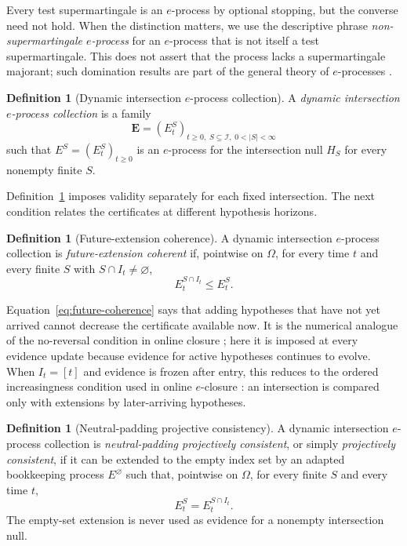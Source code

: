 \documentclass[11pt]{article}
\numberwithin{equation}{section}
\theoremstyle{plain}
\theoremstyle{definition}
\newtheorem{definition}[theorem]{Definition}
\newcommand{\Iuniv}{\mathcal I}
\begin{document}
Every test supermartingale is an $e$-process by optional stopping, but the converse need not hold. When the distinction matters, we use the descriptive phrase \emph{non-supermartingale $e$-process} for an $e$-process that is not itself a test supermartingale. This does not assert that the process lacks a supermartingale majorant; such domination results are part of the general theory of $e$-processes \citep{RamdasRufLarssonKoolen2020}.

\begin{definition}[Dynamic intersection $e$-process collection]\label{def:intersection-system}
A \emph{dynamic intersection $e$-process collection} is a family
\[
  \mathbf E=(E_t^S)_{t\geq0,\;S\subseteq\Iuniv,\;0<|S|<\infty}
\]
such that $E^S=(E_t^S)_{t\geq0}$ is an $e$-process for the intersection null $H_S$ for every nonempty finite $S$.
\end{definition}

Definition~\ref{def:intersection-system} imposes validity separately for each fixed intersection. The next condition relates the certificates at different hypothesis horizons.

\begin{definition}[Future-extension coherence]\label{def:future-coherence}
A dynamic intersection $e$-process collection is \emph{future-extension coherent} if, pointwise on $\Omega$, for every time $t$ and every finite $S$ with $S\cap I_t\neq\varnothing$,
\begin{equation}\label{eq:future-coherence}
  E_t^{S\cap I_t}\leq E_t^S.
\end{equation}
\end{definition}

Equation~\eqref{eq:future-coherence} says that adding hypotheses that
have not yet arrived cannot decrease the certificate available now.
It is the numerical analogue of the no-reversal condition in online
closure \citep{FischerBofillBrannath2024}; here it is imposed at every
evidence update because evidence for active hypotheses continues to
evolve. When $I_t=[t]$ and evidence is frozen after entry, this reduces
to the ordered increasingness condition used in online $e$-closure
\citep{XuFischerRamdas2026Online}: an intersection is compared only
with extensions by later-arriving hypotheses.

\begin{definition}[Neutral-padding projective consistency]\label{def:projective-consistency}
A dynamic intersection $e$-process collection is \emph{neutral-padding projectively consistent}, or simply \emph{projectively consistent}, if it can be extended to the empty index set by an adapted bookkeeping process $E^\varnothing$ such that, pointwise on $\Omega$, for every finite $S$ and every time $t$,
\begin{equation}\label{eq:projective}
  E_t^S=E_t^{S\cap I_t}.
\end{equation}
The empty-set extension is never used as evidence for a nonempty intersection null.
\end{definition}
\end{document}
